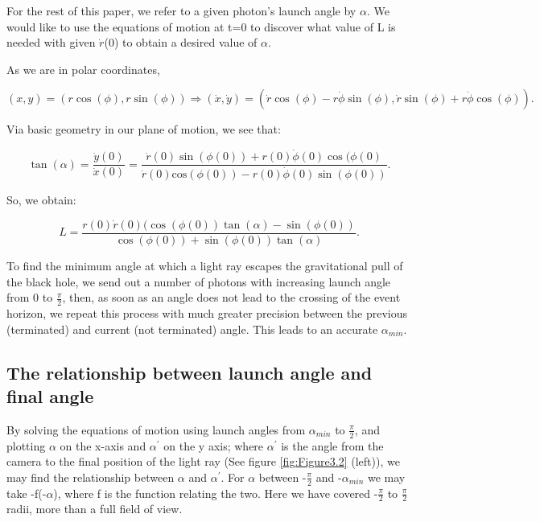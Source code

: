 \documentclass[oneside,openright,frontopenright, singlespacing]{dmathesis}
\begin{document}
	For the rest of this paper, we refer to a given photon's launch angle by $\alpha$. We would like to use the equations of motion at t=0 to discover what value of L is needed with given $\dot{r}$(0) to obtain a desired value of $\alpha$.

\vspace{1em}
	As we are in polar coordinates, 

	\[(x, y) = (r\cos(\phi), r\sin(\phi)) \Rightarrow (\dot{x}, \dot{y}) = (\dot{r}\cos(\phi) - r\dot{\phi}\sin(\phi), \dot{r}\sin(\phi) + r\dot{\phi}\cos(\phi)).\]
	
\vspace{1em}
	Via basic geometry in our plane of motion, we see that:
			
	\[\tan(\alpha) = \frac{\dot{y}(0)}{\dot{x}(0)} = \frac{\dot{r}(0)\sin(\phi(0)) + r(0)\dot{\phi}(0)\cos(\phi(0)}{\dot{r}(0)\mbox{cos}(\phi(0)) - r(0)\dot{\phi}(0)\sin(\phi(0))}.\]

\vspace{1em}
	So, we obtain:

	\[ L = \frac{r(0)\dot{r}(0)(\cos(\phi(0))\tan(\alpha)-\sin(\phi(0))}{\cos(\phi(0))+\sin(\phi(0))\tan(\alpha)}.\]
	
\vspace{1em}
	To find the minimum angle at which a light ray escapes the gravitational pull of the black hole, we send out a number of photons with increasing launch angle from 0 to $\frac{\pi}{2}$, then, as soon as an angle does not lead to the crossing of the event horizon, we repeat this process with much greater precision between the previous (terminated) and current (not terminated) angle. This leads to an accurate $\alpha_{min}$.

\subsection{The relationship between launch angle and final angle}\label{subsec:Subsection3.5.3}

	By solving the equations of motion using launch angles from $\alpha_{min}$ to $\frac{\pi}{2}$, and plotting $\alpha$ on the x-axis and $\alpha^{'}$ on the y axis; where  $\alpha^{'}$ is the angle from the camera to the final position of the light ray (See figure \ref{fig:Figure3.2} (left)), we may find the relationship between $\alpha$ and $\alpha^{'}$. For $\alpha$ between -$\frac{\pi}{2}$ and -$\alpha_{min}$ we may take -f(-$\alpha$), where f is the function relating the two. Here we have covered -$\frac{\pi}{2}$ to $\frac{\pi}{2}$ radii, more than a full field of view.
\end{document}
